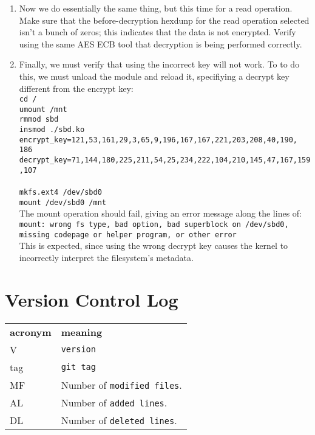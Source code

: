 \documentclass[letterpaper,10pt,titlepage,draftclsnofoot,onecolumn]{article}
\begin{document}
\begin{enumerate}
\item Now we do essentially the same thing, but this time for a read operation. Make sure that the before-decryption hexdunp for the read operation selected isn't a bunch of zeros; this indicates that the data is not encrypted. Verify using the same AES ECB tool that decryption is being performed correctly.
\item Finally, we must verify that using the incorrect key will not work. To to do this, we must unload the module and reload it, specifiying a decrypt key different from the encrypt key:\\
\texttt{cd /}\\
\texttt{umount /mnt}\\
\texttt{rmmod sbd}\\
\texttt{insmod ./sbd.ko encrypt\_key=121,53,161,29,3,65,9,196,167,167,221,203,208,40,190,}\\
\texttt{186 decrypt\_key=71,144,180,225,211,54,25,234,222,104,210,145,47,167,159,107}\\ \\
\texttt{mkfs.ext4 /dev/sbd0}\\
\texttt{mount /dev/sbd0 /mnt}\\
The mount operation should fail, giving an error message along the lines of:\\
\texttt{mount: wrong fs type, bad option, bad superblock on /dev/sbd0, missing codepage or helper program, or other error}\\
This is expected, since using the wrong decrypt key causes the kernel to incorrectly interpret the filesystem's metadata.
\end{enumerate}

\section{Version Control Log}

\begin{tabular}{lp{12cm}}
  \label{tabular:legend:git-log}
  \textbf{acronym} & \textbf{meaning} \\
  V & \texttt{version} \\
  tag & \texttt{git tag} \\
  MF & Number of \texttt{modified files}. \\
  AL & Number of \texttt{added lines}. \\
  DL & Number of \texttt{deleted lines}. \\
\end{tabular}
\end{document}
